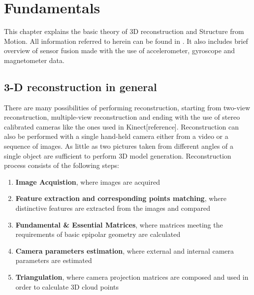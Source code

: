 \ifpdf
    \graphicspath{{figures/}{figures/comparisons}}
\else
    \graphicspath{{figures/}{figures/comparisons}}
\fi


\chapter{Fundamentals} %
This chapter explains the basic theory of 3D reconstruction and Structure from Motion. All information referred to herein can be found in \cite{HartleyMultipleView}. It also includes brief overview of sensor fusion made with the use of accelerometer, gyroscope and magnetometer data. 

\section{3-D reconstruction in general}
There are many possibilities of performing reconstruction, starting from two-view reconstruction, multiple-view reconstruction and ending with the use of stereo calibrated cameras like the ones used in Kinect[reference]. Reconstruction can also be performed with a single hand-held camera either from a video or a sequence of images. As little as two pictures taken from different angles of a single object are sufficient to perform 3D model generation. Reconstruction process consists of the following steps:
\begin{enumerate}
\item \textbf{Image Acquistion}, where images are acquired 
\item \textbf{Feature extraction and corresponding points matching}, where distinctive features are extracted from the images and compared
\item \textbf{Fundamental \& Essential Matrices}, where matrices meeting the requirements of basic epipolar geometry are calculated
\item \textbf{Camera parameters estimation}, where external and internal camera parameters are estimated
\item \textbf{Triangulation}, where camera projection matrices are composed and used in order to calculate 3D cloud points
\end{enumerate}
